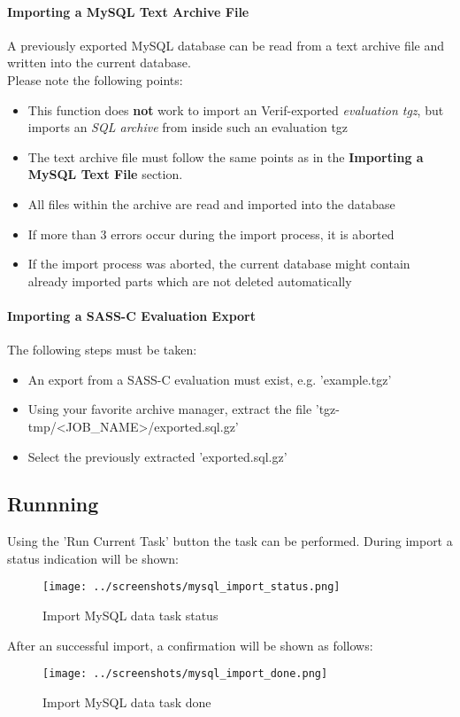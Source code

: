 \paragraph{Importing a MySQL Text Archive File}

A previously exported MySQL database can be read from a text archive file and written into the current database. \\

Please note the following points:

\begin{itemize}  
\item This function does \textbf{not} work to import an Verif-exported \textit{evaluation tgz}, but imports an \textit{SQL archive} from inside such an evaluation tgz
\item The text archive file must follow the same points as in the \textbf{Importing a MySQL Text File} section.
\item All files within the archive are read and imported into the database
\item If more than 3 errors occur during the import process, it is aborted
\item If the import process was aborted, the current database might contain already imported parts which are not deleted automatically
\end{itemize}

\paragraph{Importing a SASS-C Evaluation Export}

The following steps must be taken:\\

\begin{itemize}  
\item An export from a SASS-C evaluation must exist, e.g. 'example.tgz'
\item Using your favorite archive manager, extract the file 'tgz-tmp/<JOB\_NAME>/exported.sql.gz'
\item Select the previously extracted 'exported.sql.gz'
\end{itemize} 

\subsection{Runnning}

Using the 'Run Current Task' button the task can be performed. During import a status indication will be shown:

\begin{figure}[H]
  \center
    \texttt{[image: ../screenshots/mysql\_import\_status.png]}
  \caption{Import MySQL data task status}
\end{figure}

After an successful import, a confirmation will be shown as follows:

\begin{figure}[H]
  \center
    \texttt{[image: ../screenshots/mysql\_import\_done.png]}
  \caption{Import MySQL data task done}
\end{figure}
